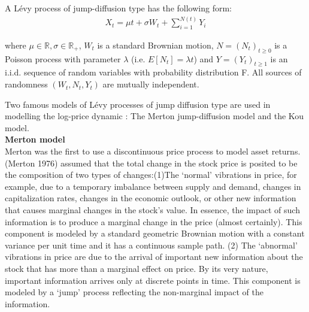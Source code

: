\documentclass[12pt]{report}
\begin{document}
A Lévy process of jump-diffusion type has the following form: 
\begin{gather}
X_t = \mu t+\sigma W_t+\sum_{i=1}^{N(t)} Y_i
\label{bar}
\end{gather}

where $\mu \in \mathbb{R}, \sigma \in \mathbb{R_+}$, $W_t$ is a standard Brownian motion, $N =(N_t)_{t \geqslant 0}$ is a Poisson process with parameter $\lambda$ (i.e. $E[N_t] = \lambda t$) and $Y = (Y_t)_{t\geqslant 1}$ is an i.i.d. sequence of random variables with probability distribution F. All sources of
randomness $(W_t,N_t,Y_t)$ are mutually independent.

Two famous models of Lévy processes of jump diffusion type are used in modelling the log-price dynamic : The Merton jump-diffusion model and the Kou model.\\

\large\textbf{Merton model}\\


Merton was the first to use a discontinuous price process to model asset returns. (Merton 1976) assumed that the total change in the stock price is posited to be the composition of two types of changes:(1)The ‘normal’ vibrations in price, for example, due to a temporary imbalance between supply and demand, changes in capitalization rates, changes in the economic outlook, or other new information that causes
marginal changes in the stock’s value. In essence, the impact of such information is to produce a marginal change in the price
(almost certainly). This component is modeled by a standard geometric Brownian
motion with a constant variance per unit time and it has a continuous sample
path. (2) The ‘abnormal’ vibrations in price are due to the arrival of important new information about the stock that has more than a marginal effect on price. By its very nature, important information arrives only
at discrete points in time. This component is modeled by a ‘jump’ process reflecting the non-marginal impact of the information.\\
\end{document}

